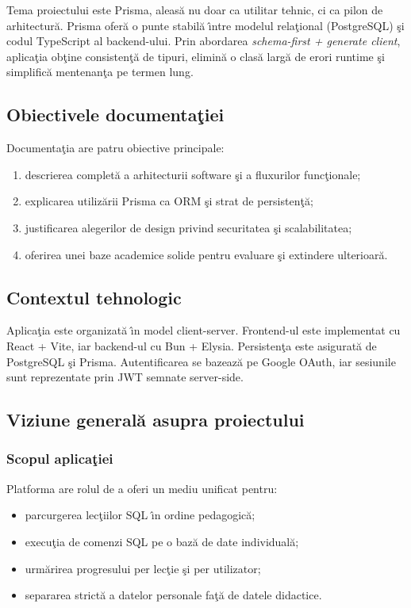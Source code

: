 \documentclass[12pt,onecolumn,draftclsnofoot]{IEEEtran}
\begin{document}
Tema proiectului este Prisma, aleas\u{a} nu doar ca utilitar tehnic, ci ca pilon de arhitectur\u{a}. Prisma ofer\u{a} o punte stabil\u{a} \^{\i}ntre modelul rela\c{t}ional (PostgreSQL) \c{s}i codul TypeScript al backend-ului. Prin abordarea \emph{schema-first + generate client}, aplica\c{t}ia ob\c{t}ine consisten\c{t}\u{a} de tipuri, elimin\u{a} o clas\u{a} larg\u{a} de erori runtime \c{s}i simplific\u{a} mentenan\c{t}a pe termen lung.

\subsection{Obiectivele documenta\c{t}iei}
Documenta\c{t}ia are patru obiective principale:
\begin{enumerate}[label=\arabic*)]
  \item descrierea complet\u{a} a arhitecturii software \c{s}i a fluxurilor func\c{t}ionale;
  \item explicarea utiliz\u{a}rii Prisma ca ORM \c{s}i strat de persisten\c{t}\u{a};
  \item justificarea alegerilor de design privind securitatea \c{s}i scalabilitatea;
  \item oferirea unei baze academice solide pentru evaluare \c{s}i extindere ulterioar\u{a}.
\end{enumerate}

\subsection{Contextul tehnologic}
Aplica\c{t}ia este organizat\u{a} \^{\i}n model client-server. Frontend-ul este implementat cu React + Vite, iar backend-ul cu Bun + Elysia. Persisten\c{t}a este asigurat\u{a} de PostgreSQL \c{s}i Prisma. Autentificarea se bazeaz\u{a} pe Google OAuth, iar sesiunile sunt reprezentate prin JWT semnate server-side.

\subsection{Viziune general\u{a} asupra proiectului}
\subsubsection{Scopul aplica\c{t}iei}
Platforma are rolul de a oferi un mediu unificat pentru:
\begin{itemize}
  \item parcurgerea lec\c{t}iilor SQL \^{\i}n ordine pedagogic\u{a};
  \item execu\c{t}ia de comenzi SQL pe o baz\u{a} de date individual\u{a};
  \item urm\u{a}rirea progresului per lec\c{t}ie \c{s}i per utilizator;
  \item separarea strict\u{a} a datelor personale fa\c{t}\u{a} de datele didactice.
\end{itemize}
\end{document}
